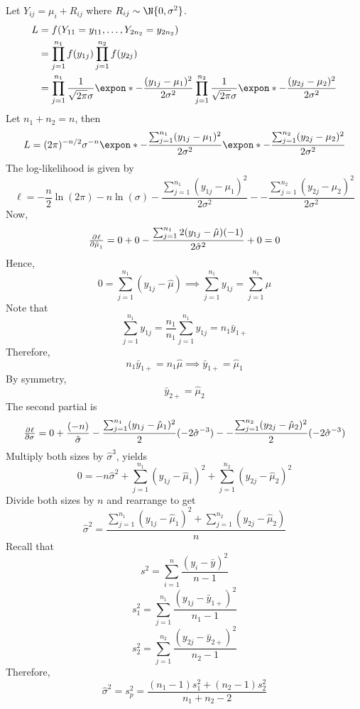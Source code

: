 \begin{Example}{}{}
    Let $ Y_{ij}=\mu_i+R_{ij} $ where $ R_{ij}\sim\N{0,\sigma^2} $.
    \begin{align*}
        L & =f(Y_{11}=y_{11},\ldots,Y_{2n_2}=y_{2n_2})                                                \\
          & =\prod_{j=1}^{n_1}f(y_{1j})\prod_{j=1}^{n_2}f(y_{2j})                                     \\
          & =\prod_{j=1}^{n_1}\frac{1}{\sqrt{2\pi}\sigma}\expon*{-\frac{(y_{1j}-\mu_1)^2}{2\sigma^2}}
        \prod_{j=1}^{n_2}\frac{1}{\sqrt{2\pi}\sigma}\expon*{-\frac{(y_{2j}-\mu_2)^2}{2\sigma^2}}
    \end{align*}
    Let $ n_1+n_2=n $, then
    \[ L=(2\pi)^{-n/2}\sigma^{-n}\expon*{-\frac{\sum_{j=1}^{n_1}(y_{1j}-\mu_1)^2}{2\sigma^2}}
        \expon*{-\frac{\sum_{j=1}^{n_2}(y_{2j}-\mu_2)^2}{2\sigma^2}} \]
    The log-likelihood is given by
    \[ \ell=-\frac{n}{2}\ln(2\pi)-n\ln(\sigma)-\frac{\sum_{j=1}^{n_1} (y_{1j}-\mu_1)^2}{2\sigma^2}-
        -\frac{\sum_{j=1}^{n_2}(y_{2j}-\mu_2)^2}{2\sigma^2} \]
    Now,
    \[ \pd{\ell}{\hat{\mu}_1}=0+0-\frac{\sum_{j=1}^{n_1}2(y_{1j}-\hat{\mu})(-1) }{2\hat{\sigma}^2}+0=0 \]
    Hence,
    \[ 0=\sum_{j=1}^{n_1}(y_{1j}-\hat{\mu})\implies \sum_{j=1}^{n_1}y_{1j}=\sum_{j=1}^{n_1}\hat{\mu} \]
    Note that
    \[ \sum_{j=1}^{n_1}y_{1j}=\frac{n_1}{n_1} \sum_{j=1}^{n_1} y_{1j}=n_1\bar{y}_{1+}  \]
    Therefore,
    \[ n_1\bar{y}_{1+}=n_1\hat{\mu}\implies \bar{y}_{1+}=\hat{\mu}_1 \]
    By symmetry,
    \[ \bar{y}_{2+}=\hat{\mu}_2 \]
    The second partial is
    \[ \pd{\ell}{\sigma}=0+\frac{(-n)}{\hat{\sigma}}-\frac{\sum_{j=1}^{n_1} (y_{1j}-\hat{\mu}_1)^2}{2}(-2\hat{\sigma}^{-3})-
        -\frac{\sum_{j=1}^{n_2}(y_{2j}-\hat{\mu}_2)^2}{2}(-2\hat{\sigma}^{-3})
    \]
    Multiply both sizes by $ \hat{\sigma}^3 $, yields
    \[ 0=-n\hat{\sigma}^2+\sum_{j=1}^{n_1} (y_{1j}-\hat{\mu}_1)^2
        +\sum_{j=1}^{n_2}(y_{2j}-\hat{\mu}_2)^2 \]
    Divide both sizes by $ n $ and rearrange to get
    \[ \hat{\sigma}^2=\frac{\sum_{j=1}^{n_1} (y_{1j}-\hat{\mu}_1)^2+\sum_{j=1}^{n_{2}}(y_{2j}-\hat{\mu}_2) }{n} \]
    Recall that
    \[ s^2=\sum_{i=1}^{n} \frac{(y_i-\bar{y})^2}{n-1}  \]
    \[ s_1^2=\sum_{j=1}^{n_1}\frac{(y_{1j}-\bar{y}_{1+})^2}{n_1-1} \]
    \[ s_2^2=\sum_{j=1}^{n_2}\frac{(y_{2j}-\bar{y}_{2+})^2}{n_2-1} \]
    Therefore,
    \[ \hat{\sigma}^2=s_p^2=\frac{(n_1-1)s_1^2+(n_2-1)s_2^2}{n_1+n_2-2}  \]
\end{Example}
